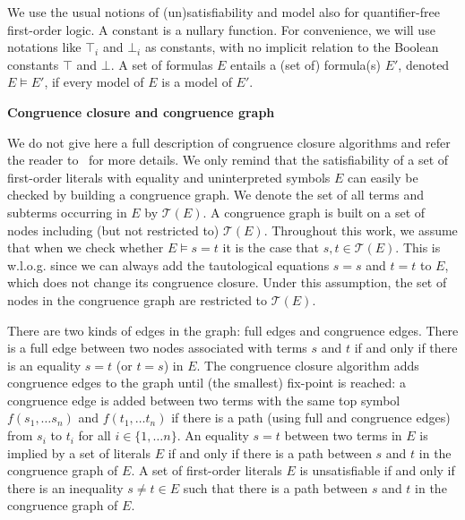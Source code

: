 \documentclass{easychair}
\begin{document}
We use the usual notions of (un)satisfiability and model also for
quantifier-free first-order logic.  A constant is a nullary function.  For
convenience, we will use notations like $\top_i$ and $\bot_i$ as constants, with
no implicit relation to the Boolean constants $\top$ and $\bot$.  A set of
formulas $E$ entails a (set of) formula(s) $E'$, denoted $E\models E'$, if every
model of $E$ is a model of $E'$.

\vspace*{5pt}
\noindent \textbf{Congruence closure and congruence graph}

\noindent
We do not give here a full description of congruence closure algorithms and
refer the reader to~\cite{Nelson2,Downey1,Nieuwenhuis6} for more details.  We
only remind that the satisfiability of a set of first-order literals with
equality and uninterpreted symbols $E$ can easily be checked by building a
congruence graph.
We denote the set of all terms and subterms occurring in $E$ by $\mathcal{T}(E)$.
A congruence graph is built on a set of nodes including (but
not restricted to) $\mathcal{T}(E)$.  
Throughout this work, we assume that when we check whether $E \models s = t$ it is the case that $s,t\in \mathcal{T}(E)$. 
This is w.l.o.g. since we can always add the tautological equations $s=s$ and $t=t$ to $E$, which does not change its congruence closure.
Under this assumption, the set of nodes in the congruence graph are restricted to $\mathcal{T}(E)$. %

There are two kinds of edges in the graph: full edges and congruence edges.
There is a full edge between two nodes associated with terms $s$ and $t$ if and
only if there is an equality $s=t$ (or $t=s$) in $E$.  The congruence closure
algorithm adds congruence edges to the graph until (the smallest) fix-point is
reached: a congruence edge is added between two terms with the same top symbol
$f(s_1, \dots s_n)$ and $f(t_1, \dots t_n)$ if there is a path (using full and
congruence edges) from $s_i$ to $t_i$ for all $i\in \{1,\dots n\}$.  An equality
$s=t$ between two terms in $E$ is implied by a set of literals $E$ if and only if
there is a path between $s$ and $t$ in the congruence graph of $E$.  A set of
first-order literals $E$ is unsatisfiable if and only if there is an inequality
$s\neq t \in E$ such that there is a path between $s$ and $t$ in the congruence
graph of $E$.
\end{document}
